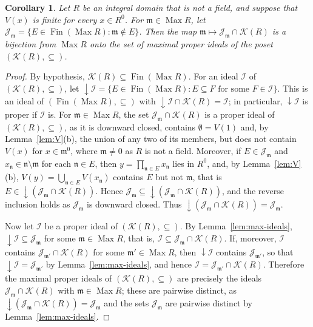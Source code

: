 \documentclass[12pt,reqno,a4paper]{amsart}
\newcommand{\K}{\mathcal{K}}
\newcommand{\m}{\mathfrak{m}}
\newcommand{\mn}{\mathfrak{n}}
\DeclareMathOperator{\Max}{Max}
\DeclareMathOperator{\Fin}{Fin}
\theoremstyle{plain}
\newtheorem{corollary}[theorem]{Corollary}
\theoremstyle{definition}
\begin{document}
\begin{corollary}\label{cor:max-ideals-K}
Let $R$ be an integral domain that is not a field, and suppose that $V(x)$ is finite for every $x\in R^0$. For $\m\in\Max R$, let $\mathcal J_{\m}
=\{E\in\Fin(\Max R):\m\notin E\}$. Then the map $\m\mapsto\mathcal{J}_\m\cap\K(R)$ is a bijection from $\Max R$ onto the set of maximal proper ideals of the poset $(\K(R),\subseteq)$.
\end{corollary}
\begin{proof}
By hypothesis, $\K(R)\subseteq\Fin(\Max R)$. For an ideal $\mathcal{I}$ of $(\K(R),\subseteq)$, let ${\downarrow}\mathcal{I}=\{E\in\Fin(\Max R):E\subseteq F\text{ for some }F\in\mathcal{I}\}$. This is an ideal of $(\Fin(\Max R),\subseteq)$ with ${\downarrow}\mathcal{I}\cap\K(R)=\mathcal{I}$; in particular, ${\downarrow}\mathcal{I}$ is proper if $\mathcal{I}$ is. For $\m\in\Max R$, the set $\mathcal{J}_\m\cap\K(R)$ is a proper ideal of $(\K(R),\subseteq)$, as it is downward closed, contains $\emptyset=V(1)$ and, by Lemma~\ref{lem:V}(b), the union of any two of its members, but does not contain $V(x)$ for $x\in\m^0$, where $\m\neq0$ as $R$ is not a field. Moreover, if $E\in\mathcal{J}_\m$ and $x_\mn\in\mn\setminus\m$ for each $\mn\in E$, then $y=\prod\limits_{\mn\in E}x_\mn$ lies in $R^0$, and, by Lemma~\ref{lem:V}(b), $V(y)=\bigcup\limits_{\mn\in E}V(x_\mn)$ contains $E$ but not $\m$, that is $E\in{\downarrow}(\mathcal{J}_\m\cap\K(R))$. Hence $\mathcal{J}_\m\subseteq{\downarrow}(\mathcal{J}_\m\cap\K(R))$, and the reverse inclusion holds as $\mathcal{J}_\m$ is downward closed. Thus ${\downarrow}(\mathcal{J}_\m\cap\K(R))=\mathcal{J}_\m$. 

Now let $\mathcal{I}$ be a proper ideal of $(\K(R),\subseteq)$. By Lemma~\ref{lem:max-ideals}, ${\downarrow}\mathcal{I}\subseteq\mathcal{J}_\m$ for some $\m\in\Max R$, that is, $\mathcal{I}\subseteq\mathcal{J}_\m\cap\K(R)$. If, moreover, $\mathcal{I}$ contains $\mathcal{J}_{\m'}\cap\K(R)$ for some $\m'\in\Max R$, then ${\downarrow}\mathcal{I}$ contains $\mathcal{J}_{\m'}$, so that ${\downarrow}\mathcal{I}=\mathcal{J}_{\m'}$ by Lemma~\ref{lem:max-ideals}, and hence $\mathcal{I}=\mathcal{J}_{\m'}\cap\K(R)$. Therefore the maximal proper ideals of $(\K(R),\subseteq)$ are precisely the ideals $\mathcal{J}_\m\cap\K(R)$ with $\m\in\Max R$; these are pairwise distinct, as ${\downarrow}(\mathcal{J}_\m\cap\K(R))=\mathcal{J}_\m$ and the sets $\mathcal{J}_\m$ are pairwise distinct by Lemma~\ref{lem:max-ideals}.
\end{proof}
\end{document}
